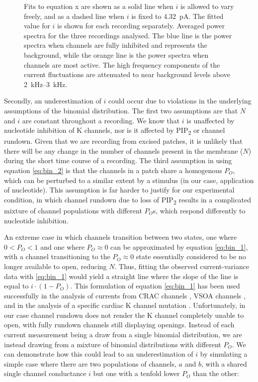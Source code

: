 \begin{figure}[h]
{	Fits to equation x are shown as a solid line when $i$ is allowed to vary freely, and as a dashed line when $i$ is fixed to \SI{4.32}{\pico\ampere}.
	The fitted value for $i$ is shown for each recording separately.
	 Averaged power spectra for the three recordings analysed.
	The blue line is the power spectra when channels are fully inhibited and represents the background, while the orange line is the power spectra when channels are most active.
	The high frequency components of the current fluctuations are attenuated to near background levels above \SIrange{2}{3}{\kilo\hertz}.
	}\label{ch4fig:noise_manual}
\end{figure}

Secondly, an underestimation of $i$ could occur due to violations in the underlying assumptions of the binomial distribution.
The first two assumptions are that $N$ and $i$ are constant throughout a recording.
We know that $i$ is unaffected by nucleotide inhibition of K\ATP{} channels, nor is it affected by PIP\textsubscript{2} or channel rundown.
Given that we are recording from excised patches, it is unlikely that there will be any change in the number of channels present in the membrane ($N$) during the short time course of a recording.
The third assumption in using equation \ref{eq:bin_2} is that the channels in a patch share a homogenous $P_O$, which can be perturbed to a similar extent by a stimulus (in our case, application of nucleotide).
This assumption is far harder to justify for our experimental condition, in which channel rundown due to loss of PIP\textsubscript{2} results in a complicated mixture of channel populations with different $P_O$s, which respond differently to nucleotide inhibition.

An extreme case in which channels transition between two states, one where $0 < P_O < 1$ and one where $P_O \approx 0$ can be approximated by equation \ref{eq:bin_1}, with a channel transitioning to the $P_O \approx 0$ state essentially considered to be no longer available to open, reducing $N$.
Thus, fitting the observed current-variance data with \ref{eq:bin_1} would yield a straight line where the slope of the line is equal to $i \cdot (1 - P_O)$.
This formulation of equation \ref{eq:bin_1} has been used successfully in the analysis of currents from CRAC channels \cite{prakriya_regulation_2006}, VSOA channels \cite{jackson_single-channel_1995, jackson_single_1996}, and in the analysis of a specific cardiac K\ATP{} channel mutation \cite{tammaro_mutation_2007}.
Unfortunately, in our case channel rundown does not render the K\ATP{} channel completely unable to open, with fully rundown channels still displaying openings.
Instead of each current measurement being a draw from a single binomial distribution, we are instead drawing from a mixture of binomial distributions with different $P_O$.
We can demonstrate how this could lead to an underestimation of $i$ by simulating a simple case where there are two populations of channels, $a$ and $b$, with a shared single channel conductance $i$ but one with a tenfold lower $P_O$ than the other:

